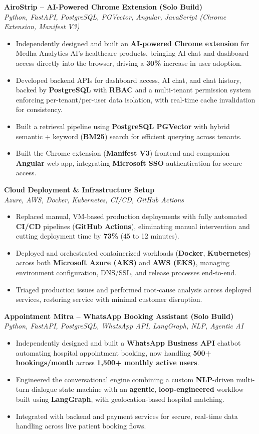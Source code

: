 \documentclass[10pt,letterpaper]{article}
\newcommand{\projtitle}[2]{\textbf{#1} \\[-1pt] \textit{#2}\\[-3pt]}
\begin{document}
\projtitle{AiroStrip -- AI-Powered Chrome Extension (Solo Build)}{Python, FastAPI, PostgreSQL, PGVector, Angular, JavaScript (Chrome Extension, Manifest V3)}
\begin{itemize}
\item Independently designed and built an \textbf{AI-powered Chrome extension} for Medha Analytics AI's healthcare products, bringing AI chat and dashboard access directly into the browser, driving a \textbf{30\%} increase in user adoption.
\item Developed backend APIs for dashboard access, AI chat, and chat history, backed by \textbf{PostgreSQL} with \textbf{RBAC} and a multi-tenant permission system enforcing per-tenant/per-user data isolation, with real-time cache invalidation for consistency.
\item Built a retrieval pipeline using \textbf{PostgreSQL PGVector} with hybrid semantic + keyword (\textbf{BM25}) search for efficient querying across tenants.
\item Built the Chrome extension (\textbf{Manifest V3}) frontend and companion \textbf{Angular} web app, integrating \textbf{Microsoft SSO} authentication for secure access.
\end{itemize}

\projtitle{Cloud Deployment \& Infrastructure Setup}{Azure, AWS, Docker, Kubernetes, CI/CD, GitHub Actions}
\begin{itemize}
\item Replaced manual, VM-based production deployments with fully automated \textbf{CI/CD} pipelines (\textbf{GitHub Actions}), eliminating manual intervention and cutting deployment time by \textbf{73\%} (45 to 12 minutes).
\item Deployed and orchestrated containerized workloads (\textbf{Docker}, \textbf{Kubernetes}) across both \textbf{Microsoft Azure (AKS)} and \textbf{AWS (EKS)}, managing environment configuration, DNS/SSL, and release processes end-to-end.
\item Triaged production issues and performed root-cause analysis across deployed services, restoring service with minimal customer disruption.
\end{itemize}

\projtitle{Appointment Mitra -- WhatsApp Booking Assistant (Solo Build)}{Python, FastAPI, PostgreSQL, WhatsApp API, LangGraph, NLP, Agentic AI}
\begin{itemize}
\item Independently designed and built a \textbf{WhatsApp Business API} chatbot automating hospital appointment booking, now handling \textbf{500+ bookings/month} across \textbf{1,500+ monthly active users}.
\item Engineered the conversational engine combining a custom \textbf{NLP}-driven multi-turn dialogue state machine with an \textbf{agentic}, \textbf{loop-engineered} workflow built using \textbf{LangGraph}, with geolocation-based hospital matching.
\item Integrated with backend and payment services for secure, real-time data handling across live patient booking flows.
\end{itemize}
\end{document}
